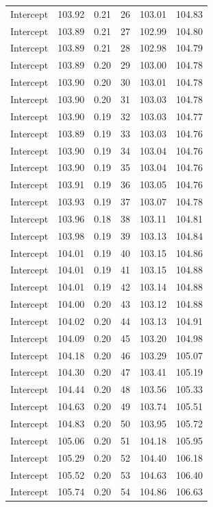 \documentclass[
]{article}
\begin{document}
\begin{longtable}[]{@{}lrrrrr@{}}
Intercept & 103.92 & 0.21 & 26 & 103.01 & 104.83 \\
Intercept & 103.89 & 0.21 & 27 & 102.99 & 104.80 \\
Intercept & 103.89 & 0.21 & 28 & 102.98 & 104.79 \\
Intercept & 103.89 & 0.20 & 29 & 103.00 & 104.78 \\
Intercept & 103.90 & 0.20 & 30 & 103.01 & 104.78 \\
Intercept & 103.90 & 0.20 & 31 & 103.03 & 104.78 \\
Intercept & 103.90 & 0.19 & 32 & 103.03 & 104.77 \\
Intercept & 103.89 & 0.19 & 33 & 103.03 & 104.76 \\
Intercept & 103.90 & 0.19 & 34 & 103.04 & 104.76 \\
Intercept & 103.90 & 0.19 & 35 & 103.04 & 104.76 \\
Intercept & 103.91 & 0.19 & 36 & 103.05 & 104.76 \\
Intercept & 103.93 & 0.19 & 37 & 103.07 & 104.78 \\
Intercept & 103.96 & 0.18 & 38 & 103.11 & 104.81 \\
Intercept & 103.98 & 0.19 & 39 & 103.13 & 104.84 \\
Intercept & 104.01 & 0.19 & 40 & 103.15 & 104.86 \\
Intercept & 104.01 & 0.19 & 41 & 103.15 & 104.88 \\
Intercept & 104.01 & 0.19 & 42 & 103.14 & 104.88 \\
Intercept & 104.00 & 0.20 & 43 & 103.12 & 104.88 \\
Intercept & 104.02 & 0.20 & 44 & 103.13 & 104.91 \\
Intercept & 104.09 & 0.20 & 45 & 103.20 & 104.98 \\
Intercept & 104.18 & 0.20 & 46 & 103.29 & 105.07 \\
Intercept & 104.30 & 0.20 & 47 & 103.41 & 105.19 \\
Intercept & 104.44 & 0.20 & 48 & 103.56 & 105.33 \\
Intercept & 104.63 & 0.20 & 49 & 103.74 & 105.51 \\
Intercept & 104.83 & 0.20 & 50 & 103.95 & 105.72 \\
Intercept & 105.06 & 0.20 & 51 & 104.18 & 105.95 \\
Intercept & 105.29 & 0.20 & 52 & 104.40 & 106.18 \\
Intercept & 105.52 & 0.20 & 53 & 104.63 & 106.40 \\
Intercept & 105.74 & 0.20 & 54 & 104.86 & 106.63 \\

\end{longtable}
\end{document}
